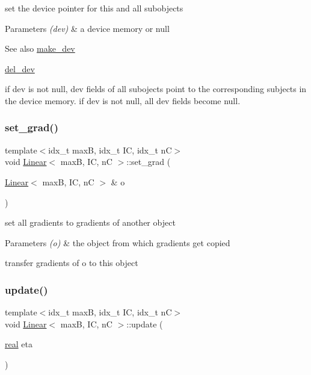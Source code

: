 set the device pointer for this and all subobjects 


\begin{DoxyParams}{Parameters}
{\em (dev)} & a device memory or null \\
\hline
\end{DoxyParams}
\begin{DoxySeeAlso}{See also}
\hyperlink{structLinear_aecf7edf669cf1182b49b604a2c9b3212}{make\+\_\+dev} 

\hyperlink{structLinear_ad691fa515105ec71c69eed5f0ae03af6}{del\+\_\+dev}
\end{DoxySeeAlso}
if dev is not null, dev fields of all subojects point to the corresponding subjects in the device memory. if dev is not null, all dev fields become null. \mbox{\label{structLinear_a4faa818e70d779b80663b361a1e7ef75}} 
\subsubsection{\texorpdfstring{set\+\_\+grad()}{set\_grad()}}
{\footnotesize\ttfamily template$<$idx\+\_\+t maxB, idx\+\_\+t IC, idx\+\_\+t nC$>$ \\
void \hyperlink{structLinear}{Linear}$<$ maxB, IC, nC $>$\+::set\+\_\+grad (\begin{DoxyParamCaption}\item[{\hyperlink{structLinear}{Linear}$<$ maxB, IC, nC $>$ \&}]{o }\end{DoxyParamCaption})\hspace{0.3cm}{\ttfamily [inline]}}



set all gradients to gradients of another object 


\begin{DoxyParams}{Parameters}
{\em (o)} & the object from which gradients get copied\\
\hline
\end{DoxyParams}
transfer gradients of o to this object \mbox{\label{structLinear_a828a72af0a1ccac904325ee280dbefa4}} 
\subsubsection{\texorpdfstring{update()}{update()}}
{\footnotesize\ttfamily template$<$idx\+\_\+t maxB, idx\+\_\+t IC, idx\+\_\+t nC$>$ \\
void \hyperlink{structLinear}{Linear}$<$ maxB, IC, nC $>$\+::update (\begin{DoxyParamCaption}\item[{\hyperlink{vgg__util_8h_a1082d08aaa761215ec83e7149f27ad16}{real}}]{eta }\end{DoxyParamCaption})\hspace{0.3cm}{\ttfamily [inline]}}



